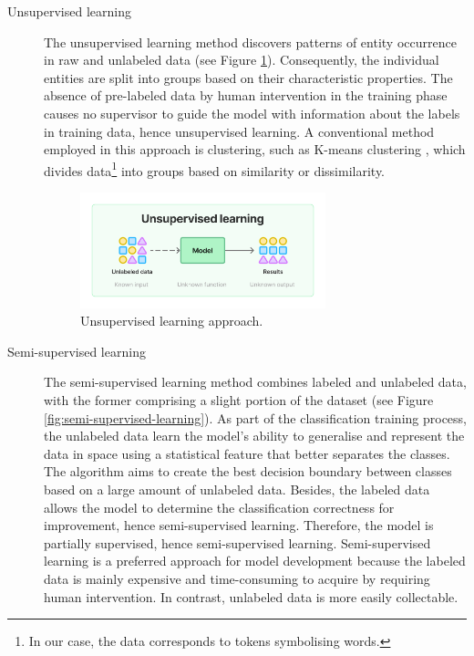 \begin{description}
    \item[Unsupervised learning] The unsupervised learning method discovers patterns of entity occurrence in raw and unlabeled data (see Figure \ref{fig:unsupervised-learning}). Consequently, the individual entities are split into groups based on their characteristic properties. The absence of pre-labeled data by human intervention in the training phase causes no supervisor to guide the model with information about the labels in training data, hence unsupervised learning. A conventional method employed in this approach is clustering, such as K-means clustering \parencite{9072123kmeans}, which divides data\footnote{In our case, the data corresponds to tokens symbolising words.} into groups based on similarity or dissimilarity.
    \begin{figure}[H]
        \centering
        \includegraphics[width=0.7\textwidth]{img/theoretical/unsupervised.pdf}
        \caption{Unsupervised learning approach.}
        \label{fig:unsupervised-learning}
    \end{figure}
    \item[Semi-supervised learning] The semi-supervised learning method combines labeled and unlabeled data, with the former comprising a slight portion of the dataset (see Figure \ref{fig:semi-supervised-learning}). As part of the classification training process, the unlabeled data learn the model's ability to generalise and represent the data in space using a statistical feature that better separates the classes. The algorithm aims to create the best decision boundary between classes based on a large amount of unlabeled data. Besides, the labeled data allows the model to determine the classification correctness for improvement, hence semi-supervised learning. Therefore, the model is partially supervised, hence semi-supervised learning. Semi-supervised learning is a preferred approach for model development because the labeled data is mainly expensive and time-consuming to acquire by requiring human intervention. In contrast, unlabeled data is more easily collectable.

\end{description}

